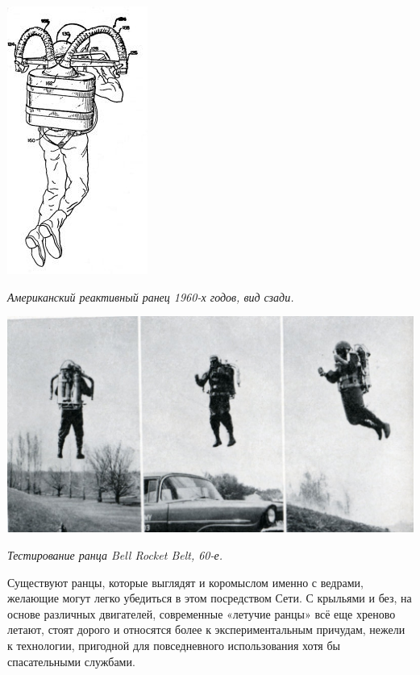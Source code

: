 \begin{center}
\includegraphics[width=0.40\linewidth]{chast-zmiy/ktotakiezmei/rocbelt-3.jpg}

\textit{Американский реактивный ранец 1960-х годов, вид сзади.}
\end{center}

\begin{center}
\includegraphics[width=\linewidth]{chast-zmiy/ktotakiezmei/1962Eaglebookofhowitworks03.jpg}

\textit{Тестирование ранца Bell Rocket Belt, 60-е.}
\end{center}

Существуют ранцы, которые выглядят и коромыслом именно с ведрами, желающие могут легко убедиться в этом посредством Сети. С крыльями и без, на основе различных двигателей, современные «летучие ранцы» всё еще хреново летают, стоят дорого и относятся более к экспериментальным причудам, нежели к технологии, пригодной для повседневного использования хотя бы спасательными службами.

